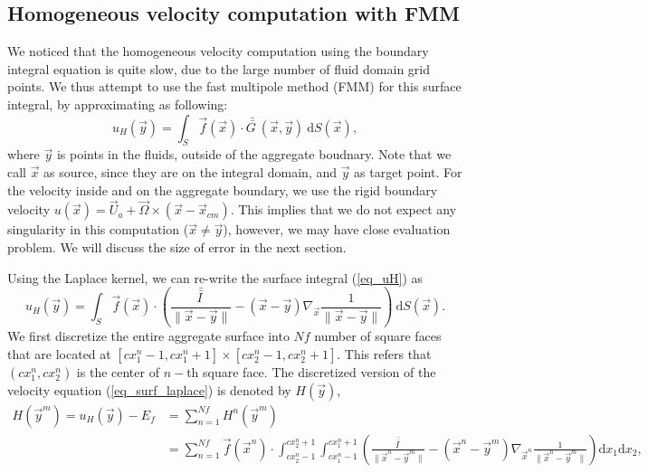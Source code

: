 \subsection{Homogeneous velocity computation with FMM}
We noticed that the homogeneous velocity computation using the boundary integral equation is quite slow, due to the large number of fluid domain grid points. We thus attempt to use the fast multipole method (FMM) for this surface integral, by approximating as following:
\begin{equation}
	u_H(\vec{y})  
	= \int_S \vec{f}(\vec{x}) \cdot \bar{\bar{G \ }}( \vec{x}, \vec{y}) \ \text{d} S(\vec{x}),
	\label{eq_uH}
\end{equation}
where $\vec{y}$ is points in the fluids, outside of the aggregate boudnary. Note that we call $\vec{x}$ as source, since they are on the integral domain, and $\vec{y}$ as target point. 
For the velocity inside and on the aggregate boundary, we use the rigid boundary velocity $u(\vec{x}) = \vec{U}_a + \vec{\Omega} \times \left(\vec{x} - \vec{x}_{cm} \right)$. This implies that we do not expect any singularity in this computation ($\vec{x} \neq \vec{y}$), however, we may have close evaluation problem. We will discuss the size of error in the next section. 
\par
Using the Laplace kernel, we can re-write the surface integral (\ref{eq_uH}) as
\begin{equation}
	u_H(\vec{y}) =
	\int_S 
	\vec{f}(\vec{x}) \cdot
  	\left(
  	\frac{\bar{\bar{I \ }}}{\|\vec{x} - \vec{y}\|}
  	- \left( \vec{x} - \vec{y} \right)
  	 \nabla_{\vec{x}}
  	\frac{1}{\|\vec{x} - \vec{y}\|}
  	\right)
	  \ \text{d} S(\vec{x}).
 \label{eq_surf_laplace}
\end{equation}
We first discretize the entire aggregate surface into $Nf$ number of square faces that are located at $[cx_1^n-1, cx^n_1+1] \times [cx^n_2-1, cx^n_2+1]$. This refers that $(cx^n_1, cx^n_2)$ is the center of $n-$th square face. The discretized version of the velocity equation (\ref{eq_surf_laplace}) is denoted by $H(\vec{y})$,
\begin{align}
	H(\vec{y}^m) = u_H(\vec{y}) - E_f
	& = \sum_{n = 1}^{Nf} H^n(\vec{y}^m) 
	\nonumber \\
	& = \sum_{n = 1}^{Nf} 
	\vec{f}(\vec{x}^n) \cdot
	\int_{cx^n_2-1}^{cx^n_2+1} \int_{cx_1^n-1}^{cx_1^n+1}
  	\left(
  	\frac{\bar{\bar{I \ }}}{\|\vec{x}^n - \vec{y}^m\|}
  	- \left( \vec{x}^n - \vec{y}^m \right)
  	 \nabla_{\vec{x}^n}
  	\frac{1}{\|\vec{x}^n - \vec{y}^m\|}
  	\right)
	  \text{d} x_1  \text{d} x_2
	  ,
 \label{eq_surf_fmm_Nf}
\end{align}
